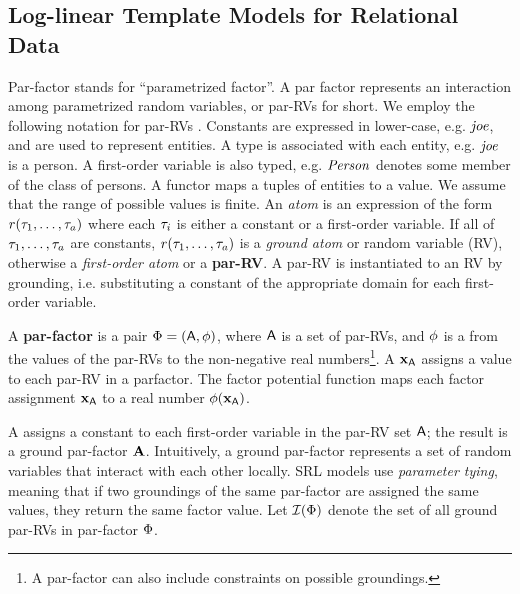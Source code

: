 \subsection{Log-linear Template Models for Relational Data} \label{sec:log-linear}

Par-factor stands for ``parametrized factor''. A par factor represents an interaction among parametrized random variables, or par-RVs for short. 
We employ the following notation 
for par-RVs \cite[2.2.5]{Kimmig2015}.
	Constants are expressed in lower-case, e.g. $\it{joe}$, and are used to represent entities. A type is associated with each entity, e.g. $\it{joe}$ is a person. 
A first-order variable is also typed, e.g. $\it{Person}$ denotes some member of the class of persons. A functor maps a tuples of entities to a value. We assume that the range of possible values is finite.  An {\em atom} is an expression of the form $r(\tau_{1},\ldots,\tau_{a})$ where each $\tau_{i}$ is either a constant or a first-order variable. If all of $\tau_{1},\ldots,\tau_{a}$ are constants, $r(\tau_{1},\ldots,\tau_{a})$ is a {\em ground atom} or random variable (RV), otherwise a {\em first-order atom} or a \textbf{par-RV}. A par-RV is instantiated to an RV by grounding, i.e. substituting a constant of the appropriate domain for each first-order variable. 

A \textbf{par-factor} is a pair $\Phi = (\mathsf{A},\phi)$, where $\mathsf{A}$ is a set of par-RVs, and $\phi$ is a  from the values of the par-RVs to the non-negative real numbers\footnote{A par-factor can also include constraints on possible groundings.}. A  $\mathbf{x}_{\mathsf{A}}$ assigns a value to each par-RV in a parfactor. The factor potential function maps each factor assignment $\mathbf{x}_{\mathsf{A}}$ to a real number $\phi(\mathbf{x}_{\mathsf{A}})$. 

A  assigns a constant to each first-order variable in the par-RV set $\mathsf{A}$; the result is a ground par-factor $\mathbf{A}$.
Intuitively, a ground par-factor represents a set of random variables that interact with each other locally. SRL models use {\em parameter tying}, meaning that if two groundings of the same par-factor are assigned the same values, they return the same factor value. Let $\mathcal{I}(\Phi)$ denote the set of  all ground par-RVs in par-factor $\Phi$. 

